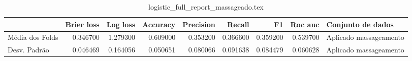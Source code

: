 \begin{table}
\centering
\caption{logistic_full_report_massageado.tex}
\label{logistic_full_report_massageado.tex}
\begin{tabular}{lrrrrrrrl}
\toprule
{}              &  Brier  loss &  Log loss &  Accuracy  &  Precision  &   Recall  &       F1  &  Roc auc  &       Conjunto de dados \\
\midrule
Média dos Folds &     0.346700 &  1.279300 &   0.609000 &    0.353200 &  0.366600 &  0.359200 &  0.539700 &  Aplicado massageamento \\
Desv. Padrão    &     0.046469 &  0.164056 &   0.050651 &    0.080066 &  0.091638 &  0.084479 &  0.060628 &  Aplicado massageamento \\
\bottomrule
\end{tabular}
\end{table}
